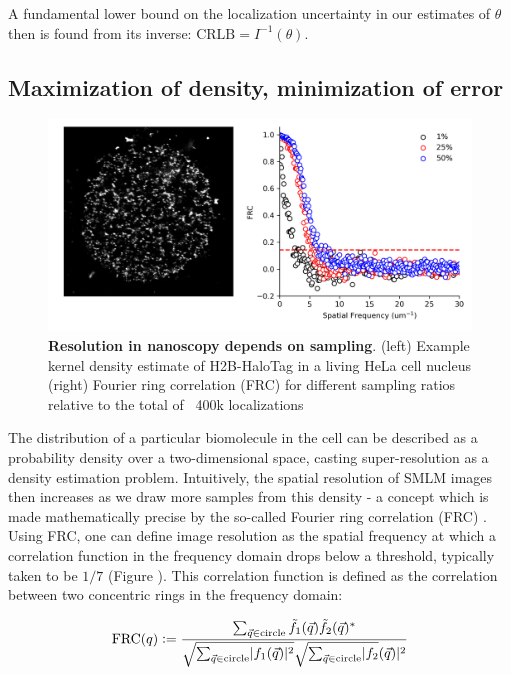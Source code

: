 A fundamental lower bound on the localization uncertainty in our estimates of $\theta$ then is found from its inverse: $\mathrm{CRLB} = I^{-1}(\theta)$.

\subsection{Maximization of density, minimization of error}

\begin{figure}[t]
\begin{center}
\includegraphics[width=14cm]{media/FRC.png}
\end{center}
\caption{\textbf{Resolution in nanoscopy depends on sampling}. (left) Example kernel density estimate of H2B-HaloTag in a living HeLa cell nucleus (right) Fourier ring correlation (FRC) for different sampling ratios relative to the total of ~400k localizations}
\label{fig:fig3}
\end{figure}

The distribution of a particular biomolecule in the cell can be described as a probability density over a two-dimensional space, casting super-resolution as a density estimation problem. Intuitively, the spatial resolution of SMLM images then increases as we draw more samples from this density - a concept which is made mathematically precise by the so-called Fourier ring correlation (FRC) \parencite{Nieuwenhuizen2013}. Using FRC, one can define image resolution as the spatial frequency at which a correlation function in the frequency domain drops below a threshold, typically taken to be $1/7$  (Figure \label{fig:fig3}). This correlation function is defined as the correlation between two concentric rings in the frequency domain:

\begin{equation*}
\mathrm{FRC}(q) \vcentcolon = \frac{\sum_{\vec{q}\in\mathrm{circle}}\tilde{f_{1}}(\vec{q})\tilde{f_{2}}(\vec{q})^{*}}{\sqrt{\sum_{\vec{q}\in\mathrm{circle}}\lvert f_{1}(\vec{q})\lvert^{2}}\sqrt{\sum_{\vec{q}\in\mathrm{circle}}\lvert f_{2}}(\vec{q})\lvert^{2}}
\end{equation*}

